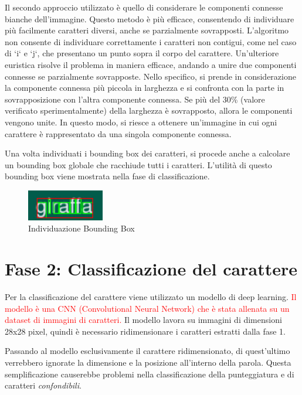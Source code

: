 Il secondo approccio utilizzato è quello di considerare le componenti connesse bianche dell'immagine. Questo metodo è più efficace, consentendo di individuare più facilmente caratteri diversi, anche se parzialmente sovrapposti. L'algoritmo non consente di individuare correttamente i caratteri non contigui, come nel caso di `i` e `j`, che presentano un punto sopra il corpo del carattere. Un'ulteriore euristica risolve il problema in maniera efficace, andando a unire due componenti connesse se parzialmente sovrapposte. Nello specifico, si prende in considerazione la componente connessa più piccola in larghezza e si confronta con la parte in sovrapposizione con l'altra componente connessa. Se più del 30\% (valore verificato sperimentalmente) della larghezza è sovrapposto, allora le componenti vengono unite. In questo modo, si riesce a ottenere un'immagine in cui ogni carattere è rappresentato da una singola componente connessa.
\newline

Una volta individuati i bounding box dei caratteri, si procede anche a calcolare un bounding box globale che racchiude tutti i caratteri. L'utilità di questo bounding box viene mostrata nella fase di classificazione.

\begin{figure}[H]
	\centering
	\includegraphics[width=0.3\textwidth]{images/giraffa-bb.jpeg}
	\caption{Individuazione Bounding Box}
	\label{fig:screenshot}
\end{figure}

\section{Fase 2: Classificazione del carattere}

Per la classificazione del carattere viene utilizzato un modello di deep learning. \textcolor{red}{Il modello è una CNN (Convolutional Neural Network) che è stata allenata su un dataset di immagini di caratteri.}
Il modello lavora su immagini di dimensioni 28x28 pixel, quindi è necessario ridimensionare i caratteri estratti dalla fase 1.


Passando al modello esclusivamente il carattere ridimensionato, di quest'ultimo verrebbero ignorate la dimensione e la posizione all'interno della parola. Questa semplificazione causerebbe problemi nella classificazione della punteggiatura e di caratteri \emph{confondibili}.

